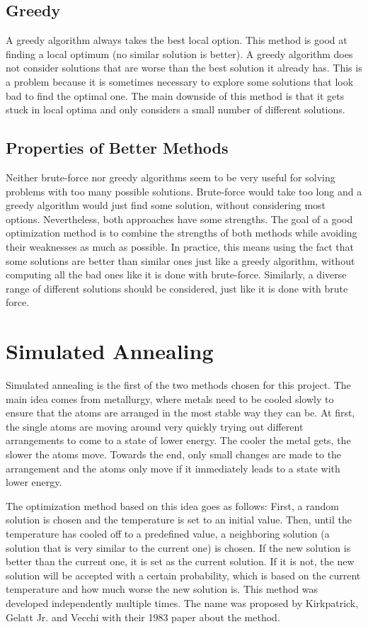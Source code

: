 \documentclass[10pt]{scrreprt}
\begin{document}
\subsection{Greedy}
A greedy algorithm always takes the best local option. This method is good at finding a local optimum (no similar solution is better). A greedy algorithm does not consider solutions that are worse than the best solution it already has. This is a problem because it is sometimes necessary to explore some solutions that look bad to find the optimal one. The main downside of this method is that it gets stuck in local optima and only considers a small number of different solutions.

\subsection{Properties of Better Methods}
Neither brute-force nor greedy algorithms seem to be very useful for solving problems with too many possible solutions. Brute-force would take too long and a greedy algorithm would just find some solution, without considering most options. Nevertheless, both approaches have some strengths. The goal of a good optimization method is to combine the strengths of both methods while avoiding their weaknesses as much as possible. In practice, this means using the fact that some solutions are better than similar ones just like a greedy algorithm, without computing all the bad ones like it is done with brute-force. Similarly, a diverse range of different solutions should be considered, just like it is done with brute force.

\section{Simulated Annealing}
Simulated annealing is the first of the two methods chosen for this project. The main idea comes from metallurgy, where metals need to be cooled slowly to ensure that the atoms are arranged in the most stable way they can be. At first, the single atoms are moving around very quickly trying out different arrangements to come to a state of lower energy. The cooler the metal gets, the slower the atoms move. Towards the end, only small changes are made to the arrangement and the atoms only move if it immediately leads to a state with lower energy.

The optimization method based on this idea goes as follows: First, a random solution is chosen and the temperature is set to an initial value. Then, until the temperature has cooled off to a predefined value, a neighboring solution (a solution that is very similar to the current one) is chosen. If the new solution is better than the current one, it is set as the current solution. If it is not, the new solution will be accepted with a certain probability, which is based on the current temperature and how much worse the new solution is. This method was developed independently multiple times. The name was proposed by Kirkpatrick, Gelatt Jr. and Vecchi with their 1983 paper \cite{SA_1983} about the method. 
\end{document}
